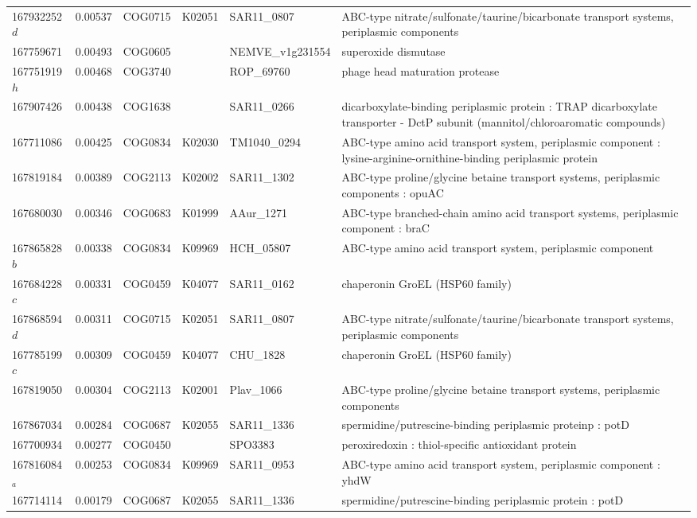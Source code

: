\begin{landscape}
\begin{longtable}{p{1.6cm}p{1.2cm}p{1.5cm}p{1.5cm}p{2.8cm}p{13.5cm}}
167932252$d$ & 0.00537 & COG0715 & K02051 & SAR11\_0807 & ABC-type nitrate/sulfonate/taurine/bicarbonate transport systems,  periplasmic components \\
167759671 & 0.00493 & COG0605 &  & NEMVE\_v1g231554 & superoxide dismutase \\
167751919$h$ & 0.00468 & COG3740 &  & ROP\_69760 & phage head maturation protease \\
167907426 & 0.00438 & COG1638 &  & SAR11\_0266 & dicarboxylate-binding periplasmic protein : TRAP dicarboxylate transporter - DctP subunit (mannitol/chloroaromatic compounds) \\
167711086 & 0.00425 & COG0834 & K02030 & TM1040\_0294 & ABC-type amino acid transport system,  periplasmic component : lysine-arginine-ornithine-binding periplasmic protein \\
167819184 & 0.00389 & COG2113 & K02002 & SAR11\_1302 & ABC-type proline/glycine betaine transport systems,  periplasmic components : opuAC \\
167680030 & 0.00346 & COG0683 & K01999 & AAur\_1271 & ABC-type branched-chain amino acid transport systems,  periplasmic component : braC \\
167865828$b$ & 0.00338 & COG0834 & K09969 & HCH\_05807 & ABC-type amino acid transport system,  periplasmic component \\
167684228$c$ & 0.00331 & COG0459 & K04077 & SAR11\_0162 & chaperonin GroEL (HSP60 family)\\
167868594$d$ & 0.00311 & COG0715 & K02051 & SAR11\_0807 & ABC-type nitrate/sulfonate/taurine/bicarbonate transport systems,  periplasmic  components \\
167785199$c$ & 0.00309 & COG0459 & K04077 & CHU\_1828 & chaperonin GroEL (HSP60 family) \\
167819050 & 0.00304 & COG2113 & K02001 & Plav\_1066 & ABC-type proline/glycine betaine transport systems,  periplasmic components \\
167867034 & 0.00284 & COG0687 & K02055 & SAR11\_1336 & spermidine/putrescine-binding periplasmic proteinp : potD \\
167700934 & 0.00277 & COG0450 &  & SPO3383 & peroxiredoxin : thiol-specific antioxidant protein \\
167816084$_a$ & 0.00253 & COG0834 & K09969 & SAR11\_0953 & ABC-type amino acid transport system,  periplasmic component : yhdW \\
167714114 & 0.00179 & COG0687 & K02055 & SAR11\_1336 & spermidine/putrescine-binding periplasmic protein : potD \\

\end{longtable}
\end{landscape}
